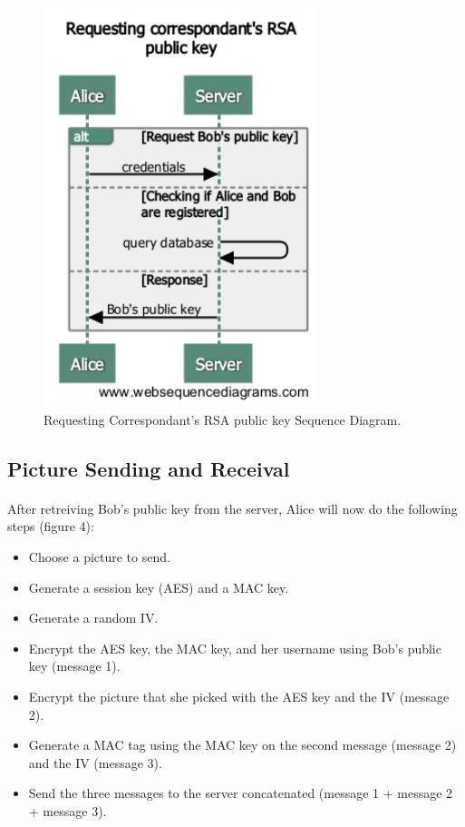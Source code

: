 	    \begin{figure}[H]
	    
	      \centering
	      \includegraphics[width=8cm]{images/architecture/requestingcorrespondant'sRSApublickey}
	      
	      \caption{Requesting Correspondant's RSA public key Sequence Diagram.}
	     
	    \end{figure}
	    
	    
	    \subsection{Picture Sending and Receival}
	    
	    \paragraph{}
	    
	    After retreiving Bob's public key from the server, Alice will now do the following steps (figure 4):
	    
	    \begin{itemize}
	     \item Choose a picture to send.
	     \item Generate a session key (AES) and a MAC key.
	     \item Generate a random IV.
	     \item Encrypt the AES key, the MAC key, and her username using Bob's public key (message 1).
	     \item Encrypt the picture that she picked with the AES key and the IV (message 2).
	     \item Generate a MAC tag using the MAC key on the second message (message 2) and the IV (message 3).
	     \item Send the three messages to the server concatenated (message 1 + message 2 + message 3).
	    \end{itemize}
	    
